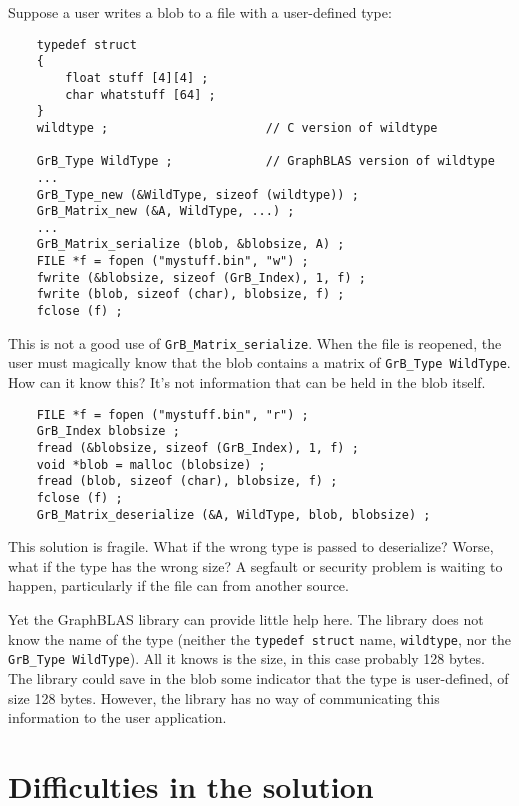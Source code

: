 \documentclass[12pt]{article}
\begin{document}
Suppose a user writes a blob to a file with a user-defined type:

{\footnotesize
\begin{verbatim}
    typedef struct
    {
        float stuff [4][4] ;
        char whatstuff [64] ;
    }
    wildtype ;                      // C version of wildtype

    GrB_Type WildType ;             // GraphBLAS version of wildtype
    ...
    GrB_Type_new (&WildType, sizeof (wildtype)) ;
    GrB_Matrix_new (&A, WildType, ...) ;
    ...
    GrB_Matrix_serialize (blob, &blobsize, A) ;
    FILE *f = fopen ("mystuff.bin", "w") ; 
    fwrite (&blobsize, sizeof (GrB_Index), 1, f) ;
    fwrite (blob, sizeof (char), blobsize, f) ;
    fclose (f) ;
\end{verbatim}}

This is not a good use of \verb'GrB_Matrix_serialize'.  When the file is
reopened, the user must magically know that the blob contains a matrix
of \verb'GrB_Type WildType'.  How can it know this?  It's not information
that can be held in the blob itself.

{\footnotesize
\begin{verbatim}
    FILE *f = fopen ("mystuff.bin", "r") ; 
    GrB_Index blobsize ;
    fread (&blobsize, sizeof (GrB_Index), 1, f) ;
    void *blob = malloc (blobsize) ;
    fread (blob, sizeof (char), blobsize, f) ;
    fclose (f) ;
    GrB_Matrix_deserialize (&A, WildType, blob, blobsize) ;
\end{verbatim}}

This solution is fragile.  What if the wrong type is passed to deserialize?
Worse, what if the type has the wrong size?  A segfault or security problem
is waiting to happen, particularly if the file can from another source.

Yet the GraphBLAS library can provide little help here.  The library does not
know the name of the type (neither the \verb'typedef struct' name,
\verb'wildtype', nor the \verb'GrB_Type WildType').  All it knows is the size,
in this case probably 128 bytes.  The library could save in the blob some
indicator that the type is user-defined, of size 128 bytes.  However, the
library has no way of communicating this information to the user application.

\section{Difficulties in the solution}
\end{document}
